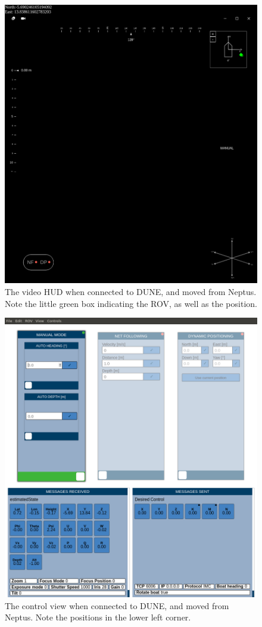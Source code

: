 \documentclass{article}
\begin{document}
\begin{figure}[H]
  \centering
  \includegraphics[width=\textwidth]{AqHUDConnected.png}
  \caption{The video HUD when connected to DUNE, and moved from Neptus. Note the little green box indicating the ROV, as well as the position.}
  \label{AqHudDUNE}
\end{figure}
\begin{figure}[H]
  \centering
  \includegraphics[width=\textwidth]{AqControlConnected.png}
  \caption{The control view when connected to DUNE, and moved from Neptus. Note the positions in the lower left corner.}
  \label{AqControlDUNE}
\end{figure}
\end{document}
